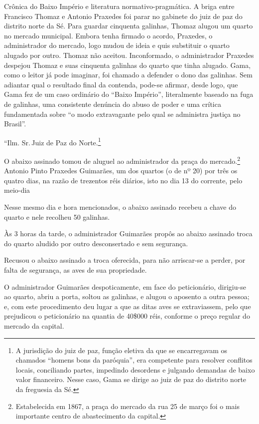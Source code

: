 \begin{didascalia}
Crônica do Baixo Império e literatura normativo-pragmática. A briga
entre Francisco Thomaz e Antonio Praxedes foi parar no gabinete do juiz
de paz do distrito norte da Sé. Para guardar cinquenta galinhas, Thomaz
alugou um quarto no mercado municipal. Embora tenha firmado o acordo,
Praxedes, o administrador do mercado, logo mudou de ideia e quis
substituir o quarto alugado por outro. Thomaz não aceitou. Inconformado,
o administrador Praxedes despejou Thomaz e suas cinquenta galinhas do
quarto que tinha alugado. Gama, como o leitor já pode imaginar, foi
chamado a defender o dono das galinhas. Sem adiantar qual o resultado
final da contenda, pode-se afirmar, desde logo, que Gama fez de um caso
ordinário do ``Baixo Império'', literalmente baseado na fuga de galinhas,
uma consistente denúncia do abuso de poder e uma crítica fundamentada
sobre ``o modo extravagante pelo qual se administra justiça no Brasil''.
\end{didascalia}



``Ilm. Sr.\,Juiz de Paz do Norte.\footnote{A jurisdição do juiz de paz,
  função eletiva da que se encarregavam os chamados ``homens bons da
  paróquia'', era competente para resolver conflitos locais, conciliando
  partes, impedindo desordens e julgando demandas de baixo valor
  financeiro. Nesse caso, Gama se dirige ao juiz de paz do distrito
  norte da freguesia da Sé.}

O abaixo assinado tomou de aluguel ao administrador da praça do
mercado.\footnote{Estabelecida em 1867, a praça do mercado da rua 25 de
  março foi o mais importante centro de abastecimento da capital.}
Antonio Pinto Praxedes Guimarães, um dos quartos (o de nº 20) por três
os quatro dias, na razão de trezentos réis diários, isto no dia 13 do
corrente, pelo meio-dia

Nesse mesmo dia e hora mencionados, o abaixo assinado recebeu a chave do
quarto e nele recolheu 50 galinhas.

Às 3 horas da tarde, o administrador Guimarães propôs ao abaixo assinado
troca do quarto aludido por outro desconsertado e sem segurança.

Recusou o abaixo assinado a troca oferecida, para não arriscar-se a
perder, por falta de segurança, as aves de sua propriedade.

O administrador Guimarães despoticamente, em face do peticionário,
dirigiu-se ao quarto, abriu a porta, soltou as galinhas, e alugou o
aposento a outra pessoa; e, com este procedimento deu lugar a que as
ditas aves se extraviassem, pelo que prejudicou o peticionário na
quantia de 40\$000 réis, conforme o preço regular do mercado da capital.

